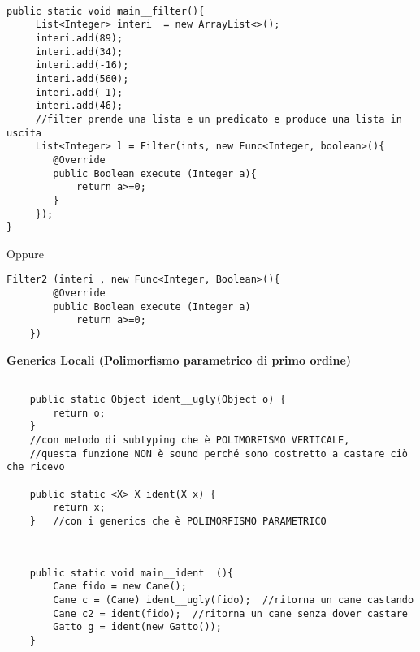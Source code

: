 \begin{lstlisting}[basicstyle=\small,]

public static void main__filter(){
	 List<Integer> interi  = new ArrayList<>();
	 interi.add(89);
	 interi.add(34);
	 interi.add(-16);
	 interi.add(560);
	 interi.add(-1);
	 interi.add(46);
	 //filter prende una lista e un predicato e produce una lista in uscita
	 List<Integer> l = Filter(ints, new Func<Integer, boolean>(){
	 	@Override
	 	public Boolean execute (Integer a){
	 		return a>=0;
	 	}
	 });
}
\end{lstlisting}

Oppure 

\begin{lstlisting}[basicstyle=\small,]
	Filter2 (interi , new Func<Integer, Boolean>(){
		@Override
		public Boolean execute (Integer a)
			return a>=0;
	})
\end{lstlisting}

\noindent \textbf{Generics Locali (Polimorfismo parametrico di primo ordine)} 

\begin{lstlisting}[basicstyle=\small,]

    public static Object ident__ugly(Object o) {
        return o;
    }   
    //con metodo di subtyping che è POLIMORFISMO VERTICALE, 
    //questa funzione NON è sound perché sono costretto a castare ciò che ricevo

    public static <X> X ident(X x) {
        return x;
    }   //con i generics che è POLIMORFISMO PARAMETRICO

\end{lstlisting}

\begin{lstlisting}[basicstyle=\small,]

	
	public static void main__ident	(){
		Cane fido = new Cane();
		Cane c = (Cane) ident__ugly(fido);  //ritorna un cane castando
		Cane c2 = ident(fido);  //ritorna un cane senza dover castare
		Gatto g = ident(new Gatto());
	}
\end{lstlisting}






















